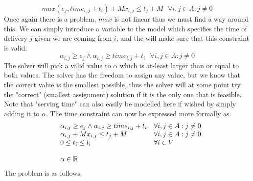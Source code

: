 \documentclass{article}
\begin{document}
    \[
        max(e_j, time_{i,j} + t_i) + Mx_{i,j} \leq t_j + M \,\,\,\, \forall i,j \in A: j \neq 0
    \]
    Once again there is a problem, $max$ is not linear thus we must find a way around this.
    We can simply introduce a variable to the model which specifies the time of delivery $j$ given we are coming from $i$, and the will make sure that this constraint is valid.
    \[
        \alpha_{i,j} \geq e_j \land \alpha_{i,j} \geq time_{i,j} + t_i \,\,\,\, \forall i,j \in A: j \neq 0
    \]
    The solver will pick a valid value to $\alpha$ which is at-least larger than or equal to both values.
    The solver has the freedom to assign any value, but we know that the correct value is the smallest possible, thus the solver will at some point try the "correct" (smallest assignment) solution if it is the only one that is feasible.
    Note that "serving time" can also easily be modelled here if wished by simply adding it to $\alpha$.
    The time constraint can now be expressed more formally as.
    \begin{equation*}
        \begin{array}{ll@{}ll}
            & \displaystyle\alpha_{i,j} \geq e_j \land \alpha_{i,j} \geq time_{i,j} + t_i &&  \forall i,j \in A: j \neq 0\\
            & \displaystyle \alpha_{i,j} + Mx_{i,j} \leq t_j + M  && \forall i,j \in A: j \neq 0\\
            & \displaystyle0 \leq t_i \leq l_i &&  \forall i \in V\\\\
            & \displaystyle \alpha \in \mathbb{R} &&\\
        \end{array}
    \end{equation*}
    The problem is as follows.
\end{document}
